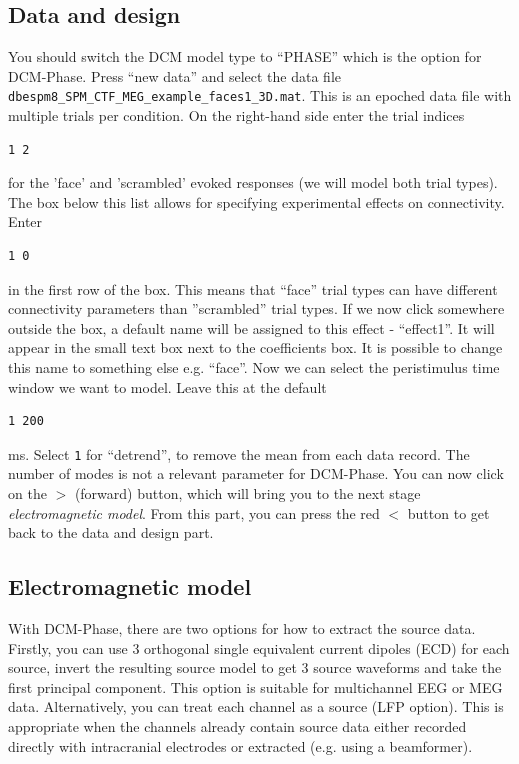 \subsection{Data and design}

 You should switch the DCM model type to ``PHASE'' which is the option for DCM-Phase. Press ``new data'' and select the data file \texttt{dbespm8\_\-SPM\_\-CTF\_\-MEG\_\-example\_\-faces1\_\-3D.mat}. This is an epoched data file with multiple trials per condition.  On the right-hand side enter the trial indices
\begin{verbatim}
1 2
\end{verbatim} 
for the 'face' and 'scrambled' evoked responses (we will model both trial types).
 The box below this list allows for specifying experimental effects on connectivity. Enter 
\begin{verbatim}
1 0
\end{verbatim} 
 in the first row of the box. This means that ``face'' trial types can have different connectivity parameters than ''scrambled'' trial types. If we now click somewhere outside the box, a default name will be assigned to this effect - ``effect1''. It will appear in the small text box next to the coefficients box. It is possible to change this name to something else e.g. ``face''. Now we can select the peristimulus time window we want to model. 
Leave this at the default
\begin{verbatim}
1 200
\end{verbatim} 
ms. Select \texttt{1} for ``detrend'', to  remove the mean from each data record.  The number of modes is not a relevant parameter for DCM-Phase. You can now click on the $>$ (forward) button, which will bring you to the next stage \textit{electromagnetic model}. From this part, you can press the red $<$ button to get back to the data and design part.

\subsection{Electromagnetic model}

With DCM-Phase, there are two options for how to extract the source data. Firstly, you can use 3 orthogonal single equivalent current dipoles (ECD) for each source, invert the resulting source model to get 3 source waveforms and take the first principal component. This option is suitable for multichannel EEG or MEG data. Alternatively, you can treat each channel as a source (LFP option). This is appropriate when the channels already contain source data either recorded directly with intracranial electrodes or extracted (e.g. using a beamformer). 

